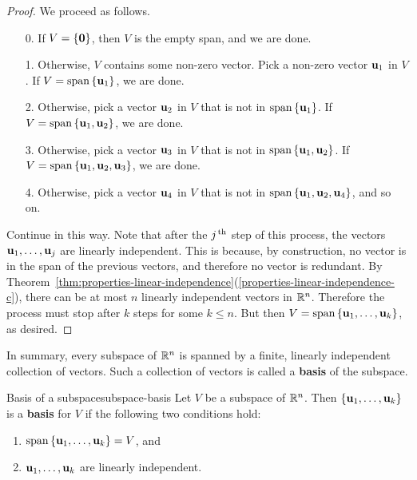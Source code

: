 \begin{proof}
  We proceed as follows.
  \begin{enumerate}
  \item[0.] If $V=\set{\vect{0}}$, then $V$ is the empty span, and we
    are done.
  \item[1.] Otherwise, $V$ contains some non-zero vector.  Pick a
    non-zero vector $\vect{u}_1$ in $V$. If
    $V=\sspan\set{\vect{u}_1}$, we are done.
  \item[2.] Otherwise, pick a vector $\vect{u}_2$ in $V$ that is not
    in $\sspan\set{\vect{u}_1}$. If
    $V=\sspan\set{\vect{u}_1,\vect{u}_2}$, we are done.
  \item[3.] Otherwise, pick a vector $\vect{u}_3$ in $V$ that is not
    in $\sspan\set{\vect{u}_1,\vect{u}_2}$. If
    $V=\sspan\set{\vect{u}_1,\vect{u}_2,\vect{u}_3}$, we are done.
  \item[4.] Otherwise, pick a vector $\vect{u}_4$ in $V$ that is not
    in $\sspan\set{\vect{u}_1,\vect{u}_2,\vect{u}_4}$, and so on.
  \end{enumerate}
  Continue in this way. Note that after the $j^{\,\rm th}$ step of this
  process, the vectors $\vect{u}_1,\ldots,\vect{u}_j$ are linearly
  independent. This is because, by construction, no vector is in the
  span of the previous vectors, and therefore no vector is redundant.
  By
  Theorem~\ref{thm:properties-linear-independence}(\ref{properties-linear-independence-c}),
  there can be at most $n$ linearly independent vectors in $\mathbb{R}^n$.
  Therefore the process must stop after $k$ steps for some $k\leq
  n$. But then $V=\sspan\set{\vect{u}_1,\ldots,\vect{u}_k}$, as
  desired.
\end{proof}

In summary, every subspace of\/ $\mathbb{R}^n$ is spanned by a finite,
linearly independent collection of vectors.  Such a collection of
vectors is called a \textbf{basis} of the subspace.

\begin{definition}{Basis of a subspace}{subspace-basis}
  Let $V$ be a subspace of\/ $\mathbb{R}^n$. Then
  $\set{\vect{u}_1,\ldots,\vect{u}_k}$ is a \textbf{basis} for
  $V$ if the following two conditions hold:%
  \begin{enumerate}
  \item $\sspan\set{\vect{u}_1,\ldots,\vect{u}_k}=V$, and
  \item $\vect{u}_1,\ldots,\vect{u}_k$ are linearly independent.
  \end{enumerate}
\end{definition}

